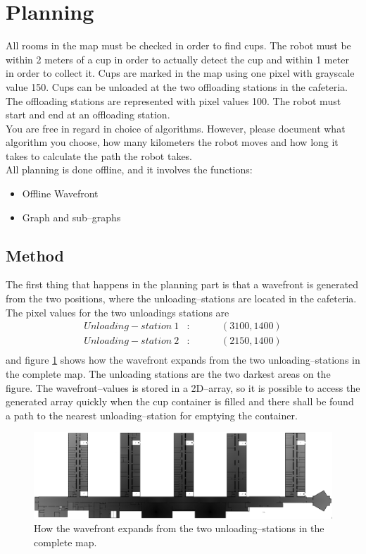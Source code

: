 \section{Planning}
\label{sec::planning}
All rooms in the map must be checked in order to find cups. The robot must be within 2 meters of a cup in order to actually detect the cup and within 1 meter in order to collect it. Cups are marked in the map using one pixel with grayscale value 150. Cups can be unloaded at the two offloading stations in the cafeteria. The offloading stations are represented with pixel values 100. The robot must start and end at an offloading station.\\[0.2cm]
You are free in regard in choice of algorithms. However, please document what algorithm you choose, how many kilometers the robot moves and how long it takes to calculate the path the robot takes.\\[0.2cm]
All planning is done offline, and it involves the functions:
\begin{itemize}\itemsep-3pt
\item Offline Wavefront
\item Graph and sub--graphs
\end{itemize}

\subsection{Method}
The first thing that happens in the planning part is that a wavefront is generated from the two positions, where the unloading--stations are located in the cafeteria. The pixel values for the two unloadings stations are 
\begin{eqnarray*}
Unloading-station\: 1&:& \hspace{1cm}(3100,1400) \\
Unloading-station\: 2&:& \hspace{1cm}(2150,1400) \\
\end{eqnarray*}
and figure \ref{fig::path} shows how the wavefront expands from the two unloading--stations in the complete map. The unloading stations are the two darkest areas on the figure. 
The wavefront--values is stored in a 2D--array, so it is possible to access the generated array quickly when the cup container is filled and there shall be found a path to the nearest unloading--station for emptying the container.

\begin{figure}[H]
\centering
\includegraphics[scale=0.3]{img/wavefront_path.png}
\caption{How the wavefront expands from the two unloading--stations in the complete map.}
\label{fig::path}
\end{figure}

